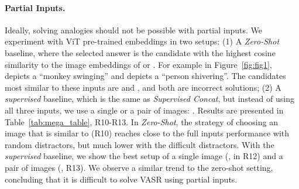 \documentclass[letterpaper]{article} \usepackage{aaai23}  \usepackage{times}  \usepackage{helvet}  \usepackage{courier}  \usepackage[hyphens]{url}  \usepackage{graphicx} \urlstyle{rm} \def\UrlFont{\rm}  \usepackage{natbib}  \usepackage{caption} \frenchspacing  \setlength{\pdfpagewidth}{8.5in}  \setlength{\pdfpageheight}{11in}  \usepackage{algorithm}
\newcommand{\trainedconcat}[0]{\emph{Supervised Concat}}
\begin{document}
\begin{table}[!t]
\caption{Results per analogy types of humans and models baselines. The class with the highest/lowest accuracy for each model is in bold. Data Percentage is the proportion of each class from the \emph{gold} test. Objects Proportion is the mean object size divided by full image size.}
\label{tab:res_per_analogy_types}
\centering
{}\end{table}

\paragraph{Partial Inputs.} Ideally, solving analogies should not be possible with partial inputs. We experiment with ViT pre-trained embeddings in two setups: (1) A \emph{Zero-Shot} baseline, where the selected answer is the candidate with the highest cosine similarity to the image embeddings of  or . For example in Figure~\ref{fig:fig1},  depicts a ``monkey swinging'' and  depicts a ``person shivering''. The candidates most similar to these inputs are  and , and both are incorrect solutions; (2) A \emph{supervised} baseline, which is the same as \trainedconcat{}, but instead of using all three inputs, we use a single or a pair of images: .
Results are presented in Table~\ref{tab:mega_table}, R10-R13. In \emph{Zero-Shot}, the strategy of choosing an image that is similar to  (R10) reaches close to the full inputs performance with random distractors, but much lower with the difficult distractors. With the \emph{supervised} baseline, we show the best setup of a single image (, in R12) and a pair of images (, R13). We observe a similar trend to the zero-shot setting, concluding that it is difficult to solve VASR using partial inputs.
\end{document}
